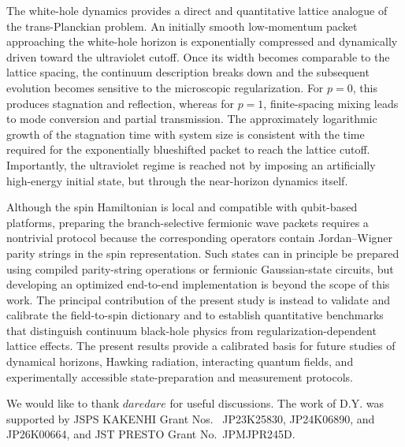 \documentclass[reprint,amsmath,amssymb,aps,prb,showkeys,superscriptaddress]{revtex4-2}
\begin{document}
The white-hole dynamics provides a direct and quantitative lattice
analogue of the trans-Planckian problem. An initially smooth
low-momentum packet approaching the white-hole horizon is
exponentially compressed and dynamically driven toward the
ultraviolet cutoff. Once its width becomes comparable to the lattice
spacing, the continuum description breaks down and the subsequent
evolution becomes sensitive to the microscopic regularization. For
$p=0$, this produces stagnation and reflection, whereas for $p=1$,
finite-spacing mixing leads to mode conversion and partial
transmission. The approximately logarithmic growth of the
stagnation time with system size is consistent with the time
required for the exponentially blueshifted packet to reach the
lattice cutoff. Importantly, the ultraviolet regime is reached not
by imposing an artificially high-energy initial state, but through
the near-horizon dynamics itself.

Although the spin Hamiltonian is local and compatible with
qubit-based platforms, preparing the branch-selective fermionic wave
packets requires a nontrivial protocol because the corresponding
operators contain Jordan--Wigner parity strings in the spin
representation. Such states can in principle be prepared using
compiled parity-string operations or fermionic Gaussian-state
circuits, but developing an optimized end-to-end implementation is
beyond the scope of this work. The principal contribution of the
present study is instead to validate and calibrate the
field-to-spin dictionary and to establish quantitative benchmarks
that distinguish continuum black-hole physics from
regularization-dependent lattice effects. The present results
provide a calibrated basis for future studies of dynamical horizons,
Hawking radiation, interacting quantum fields, and experimentally
accessible state-preparation and measurement protocols.

\begin{acknowledgments}
We would like to thank $daredare$ for useful discussions. The work of D.Y. was supported by JSPS KAKENHI Grant Nos.~ JP23K25830, JP24K06890, and JP26K00664, and JST PRESTO Grant No.~JPMJPR245D.
\end{acknowledgments}


\end{document}
